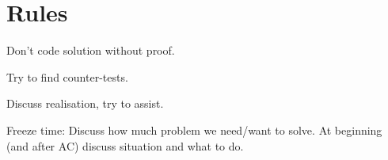 \section{Rules}
Don't code solution without proof.

Try to find counter-tests.

Discuss realisation, try to assist.



Freeze time:
Discuss how much problem we need/want to solve.
At beginning (and after AC) discuss situation and what to do.
